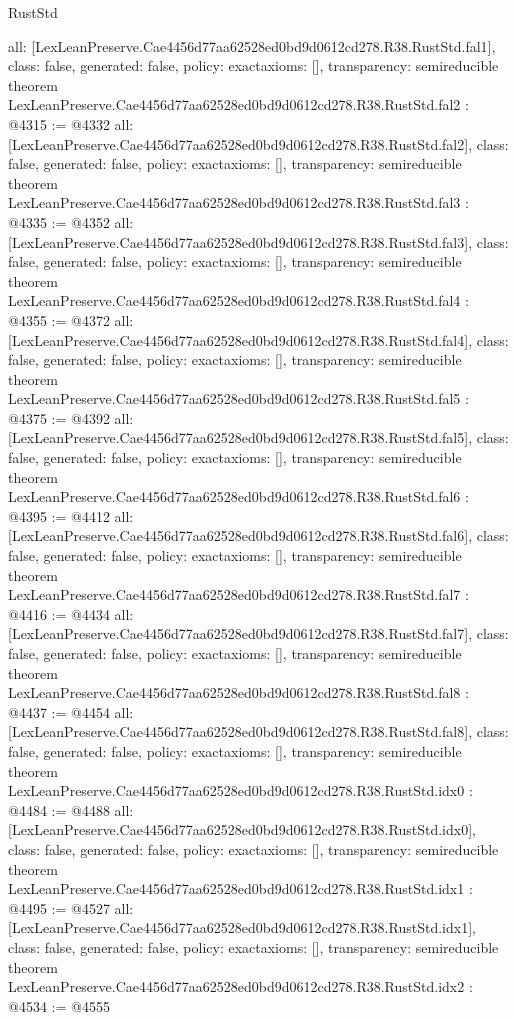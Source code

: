 \begin{lexlean}{RustStd}
\begin{coremodule}
{  all: [LexLeanPreserve.Cae4456d77aa62528ed0bd9d0612cd278.R38.RustStd.fal1],
  class: false,
  generated: false,
  policy: exact{axioms: []},
  transparency: semireducible
}
theorem LexLeanPreserve.Cae4456d77aa62528ed0bd9d0612cd278.R38.RustStd.fal2 : @4315 := @4332 {
  all: [LexLeanPreserve.Cae4456d77aa62528ed0bd9d0612cd278.R38.RustStd.fal2],
  class: false,
  generated: false,
  policy: exact{axioms: []},
  transparency: semireducible
}
theorem LexLeanPreserve.Cae4456d77aa62528ed0bd9d0612cd278.R38.RustStd.fal3 : @4335 := @4352 {
  all: [LexLeanPreserve.Cae4456d77aa62528ed0bd9d0612cd278.R38.RustStd.fal3],
  class: false,
  generated: false,
  policy: exact{axioms: []},
  transparency: semireducible
}
theorem LexLeanPreserve.Cae4456d77aa62528ed0bd9d0612cd278.R38.RustStd.fal4 : @4355 := @4372 {
  all: [LexLeanPreserve.Cae4456d77aa62528ed0bd9d0612cd278.R38.RustStd.fal4],
  class: false,
  generated: false,
  policy: exact{axioms: []},
  transparency: semireducible
}
theorem LexLeanPreserve.Cae4456d77aa62528ed0bd9d0612cd278.R38.RustStd.fal5 : @4375 := @4392 {
  all: [LexLeanPreserve.Cae4456d77aa62528ed0bd9d0612cd278.R38.RustStd.fal5],
  class: false,
  generated: false,
  policy: exact{axioms: []},
  transparency: semireducible
}
theorem LexLeanPreserve.Cae4456d77aa62528ed0bd9d0612cd278.R38.RustStd.fal6 : @4395 := @4412 {
  all: [LexLeanPreserve.Cae4456d77aa62528ed0bd9d0612cd278.R38.RustStd.fal6],
  class: false,
  generated: false,
  policy: exact{axioms: []},
  transparency: semireducible
}
theorem LexLeanPreserve.Cae4456d77aa62528ed0bd9d0612cd278.R38.RustStd.fal7 : @4416 := @4434 {
  all: [LexLeanPreserve.Cae4456d77aa62528ed0bd9d0612cd278.R38.RustStd.fal7],
  class: false,
  generated: false,
  policy: exact{axioms: []},
  transparency: semireducible
}
theorem LexLeanPreserve.Cae4456d77aa62528ed0bd9d0612cd278.R38.RustStd.fal8 : @4437 := @4454 {
  all: [LexLeanPreserve.Cae4456d77aa62528ed0bd9d0612cd278.R38.RustStd.fal8],
  class: false,
  generated: false,
  policy: exact{axioms: []},
  transparency: semireducible
}
theorem LexLeanPreserve.Cae4456d77aa62528ed0bd9d0612cd278.R38.RustStd.idx0 : @4484 := @4488 {
  all: [LexLeanPreserve.Cae4456d77aa62528ed0bd9d0612cd278.R38.RustStd.idx0],
  class: false,
  generated: false,
  policy: exact{axioms: []},
  transparency: semireducible
}
theorem LexLeanPreserve.Cae4456d77aa62528ed0bd9d0612cd278.R38.RustStd.idx1 : @4495 := @4527 {
  all: [LexLeanPreserve.Cae4456d77aa62528ed0bd9d0612cd278.R38.RustStd.idx1],
  class: false,
  generated: false,
  policy: exact{axioms: []},
  transparency: semireducible
}
theorem LexLeanPreserve.Cae4456d77aa62528ed0bd9d0612cd278.R38.RustStd.idx2 : @4534 := @4555 {
}
\end{coremodule}
\end{lexlean}
